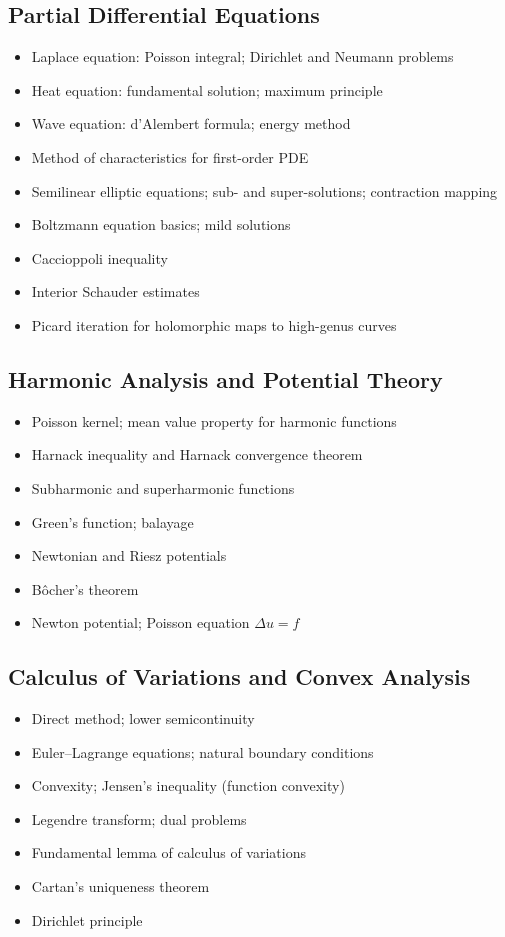 \subsection{Partial Differential Equations}

\begin{itemize}
  \item Laplace equation: Poisson integral; Dirichlet and Neumann problems
  \item Heat equation: fundamental solution; maximum principle
  \item Wave equation: d'Alembert formula; energy method
  \item Method of characteristics for first-order PDE
  \item Semilinear elliptic equations; sub- and super-solutions; contraction mapping
  \item Boltzmann equation basics; mild solutions
  \item Caccioppoli inequality
  \item Interior Schauder estimates
  \item Picard iteration for holomorphic maps to high-genus curves
\end{itemize}

\subsection{Harmonic Analysis and Potential Theory}

\begin{itemize}
  \item Poisson kernel; mean value property for harmonic functions
  \item Harnack inequality and Harnack convergence theorem
  \item Subharmonic and superharmonic functions
  \item Green's function; balayage
  \item Newtonian and Riesz potentials
  \item B\^ocher's theorem
  \item Newton potential; Poisson equation $\Delta u = f$
\end{itemize}

\subsection{Calculus of Variations and Convex Analysis}

\begin{itemize}
  \item Direct method; lower semicontinuity
  \item Euler--Lagrange equations; natural boundary conditions
  \item Convexity; Jensen's inequality (function convexity)
  \item Legendre transform; dual problems
  \item Fundamental lemma of calculus of variations
  \item Cartan's uniqueness theorem
  \item Dirichlet principle
\end{itemize}


